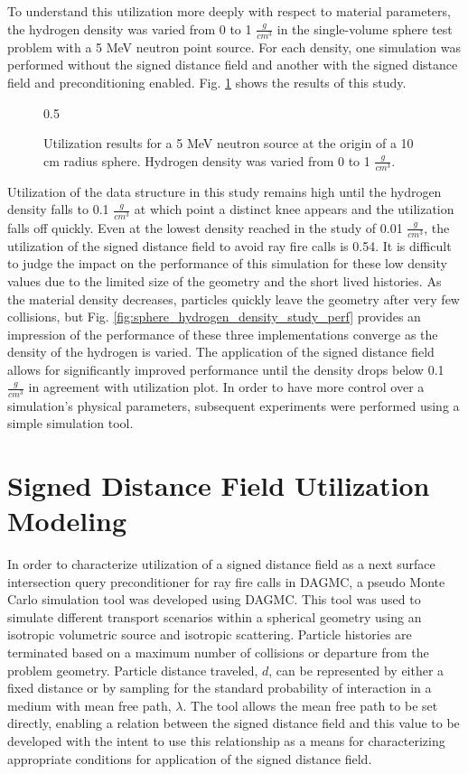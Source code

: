 To understand this utilization more deeply with respect to material parameters,
the hydrogen density was varied from 0 to 1 $\frac{g}{cm^3}$ in the single-volume
sphere test problem with a 5 MeV neutron point source. For each density, one
simulation was performed without the signed distance field and another with the
signed distance field and preconditioning enabled. Fig.
\ref{fig:sphere_hydrogen_density_study_util} shows the results of this study. 

\begin{figure}[ht]
  \centering
  {0.5\textwidth}
  \caption{Utilization results for a 5 MeV neutron source at the origin of a 10 cm radius
    sphere. Hydrogen density was varied from 0 to 1 $\frac{g}{cm^3}$.}
  \label{fig:sphere_hydrogen_density_study_util}
\end{figure}

Utilization of the data structure in this study remains high until the hydrogen
density falls to 0.1 $\frac{g}{cm^3}$ at which point a distinct knee appears and
the utilization falls off quickly. Even at the lowest density reached in the
study of 0.01 $\frac{g}{cm^3}$, the utilization of the signed distance field to
avoid ray fire calls is 0.54.  It is difficult to judge the impact on the
performance of this simulation for these low density values due to the limited
size of the geometry and the short lived histories. As the material density
decreases, particles quickly leave the geometry after very few collisions, but
Fig. \ref{fig:sphere_hydrogen_density_study_perf} provides an impression of the
performance of these three implementations converge as the density of the
hydrogen is varied. The application of the signed distance field allows for
significantly improved performance until the density drops below 0.1
$\frac{g}{cm^3}$ in agreement with utilization plot. In order to have more
control over a simulation's physical parameters, subsequent experiments were
performed using a simple simulation tool.

\section{Signed Distance Field Utilization Modeling}

In order to characterize utilization of a signed distance field as a next
surface intersection query preconditioner for ray fire calls in DAGMC, a pseudo
Monte Carlo simulation tool was developed using DAGMC. This tool was used to
simulate different transport scenarios within a spherical geometry using an
isotropic volumetric source and isotropic scattering. Particle histories are
terminated based on a maximum number of collisions or departure from the problem
geometry. Particle distance traveled, $d$, can be represented by either a fixed
distance or by sampling for the standard probability of interaction in a medium
with mean free path, $\lambda$. The tool allows the mean free path to be set
directly, enabling a relation between the signed distance field and this value
to be developed with the intent to use this relationship as a means for
characterizing appropriate conditions for application of the signed distance field.

